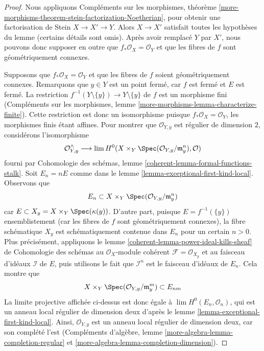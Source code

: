 \begin{proof} Nous appliquons Compléments sur les morphismes, théorème \ref{more-morphisms-theorem-stein-factorization-Noetherian}, pour obtenir une factorisation de Stein $X \to X' \to Y$. Alors $X \to X'$ satisfait toutes les hypothèses du lemme (certains détails sont omis). Après avoir remplacé $Y$ par $X'$, nous pouvons donc supposer en outre que $f_*\mathcal{O}_X = \mathcal{O}_Y$ et que les fibres de $f$ sont géométriquement connexes.

\medskip\noindent Supposons que $f_*\mathcal{O}_X = \mathcal{O}_Y$ et que les fibres de $f$ soient géométriquement connexes. Remarquons que $y \in Y$ est un point fermé, car $f$ est fermé et $E$ est fermé. La restriction $f^{-1}(Y \setminus \{y\}) \to Y \setminus \{y\}$ de $f$ est un morphisme fini (Compléments sur les morphismes, lemme \ref{more-morphisms-lemma-characterize-finite}). Cette restriction est donc un isomorphisme puisque $f_*\mathcal{O}_X = \mathcal{O}_Y$, les morphismes finis étant affines. Pour montrer que $\mathcal{O}_{Y, y}$ est régulier de dimension $2$, considérons l'isomorphisme $$
\mathcal{O}_{Y, y}^\wedge \longrightarrow
\lim H^0(X \times_Y \Spec(\mathcal{O}_{Y, y}/\mathfrak m_y^n), \mathcal{O})
$$ fourni par Cohomologie des schémas, lemme \ref{coherent-lemma-formal-functions-stalk}. Soit $E_n = nE$ comme dans le lemme \ref{lemma-exceptional-first-kind-local}. Observons que $$
E_n \subset X \times_Y \Spec(\mathcal{O}_{Y, y}/\mathfrak m_y^n)
$$ car $E \subset X_y = X \times_Y \Spec(\kappa(y))$. D'autre part, puisque $E = f^{-1}(\{y\})$ ensemblistement (car les fibres de $f$ sont géométriquement connexes), la fibre schématique $X_y$ est schématiquement contenue dans $E_n$ pour un certain $n > 0$. Plus précisément, appliquons le lemme \ref{coherent-lemma-power-ideal-kills-sheaf} de Cohomologie des schémas au $\mathcal{O}_X$-module cohérent $\mathcal{F} = \mathcal{O}_{X_y}$ et au faisceau d'idéaux $\mathcal{I}$ de $E$, puis utilisons le fait que $\mathcal{I}^n$ est le faisceau d'idéaux de $E_n$. Cela montre que $$
X \times_Y \Spec(\mathcal{O}_{Y, y}/\mathfrak m_y^m) \subset E_{nm}
$$ La limite projective affichée ci-dessus est donc égale à $\lim H^0(E_n, \mathcal{O}_n)$, qui est un anneau local régulier de dimension deux d'après le lemme \ref{lemma-exceptional-first-kind-local}. Ainsi, $\mathcal{O}_{Y, y}$ est un anneau local régulier de dimension deux, car son complété l'est (Compléments d'algèbre, lemme \ref{more-algebra-lemma-completion-regular} et \ref{more-algebra-lemma-completion-dimension}).


\end{proof}

